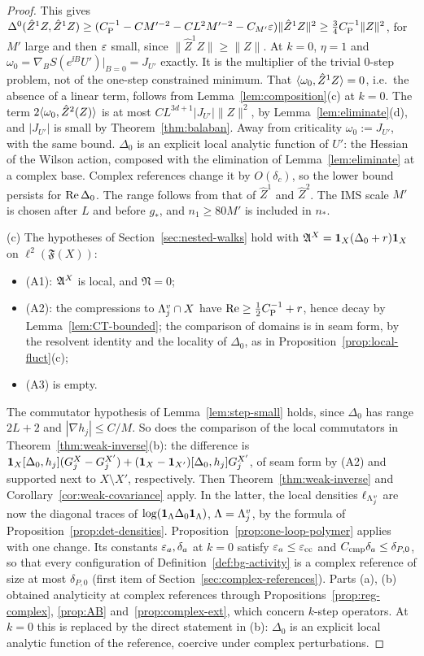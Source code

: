 \begin{proof}
This gives $\Delta^0(\hat Z^1Z,\hat Z^1Z)\ge(C_{\rm P}^{-1}-CM'^{-2}-CL^2M'^{-2}-C_{M'}\varepsilon)\|\hat Z^1Z\|^2\ge\frac34C_{\rm P}^{-1}\|Z\|^2$, for $M'$ large and then $\varepsilon$ small, since $\|\hat Z^1Z\|\ge\|Z\|$. At $k=0$, $\eta=1$ and $\omega_0=\nabla_BS(e^{\ii B}U')|_{B=0}=J_{U'}$ exactly. It is the multiplier of the trivial $0$-step problem, not of the one-step constrained minimum. That $\langle \omega_0,\hat Z^1Z\rangle=0$, i.e.\ the absence of a linear term, follows from Lemma~\ref{lem:composition}(c) at $k=0$. The term $2\langle \omega_0,\hat Z^2(Z)\rangle$ is at most $CL^{3d+1}|J_{U'}|\|Z\|^2$, by Lemma~\ref{lem:eliminate}(d), and $|J_{U'}|$ is small by Theorem~\ref{thm:balaban}. Away from criticality $\omega_0:=J_{U'}$, with the same bound. $\Delta_0$ is an explicit local analytic function of $U'$: the Hessian of the Wilson action, composed with the elimination of Lemma~\ref{lem:eliminate} at a complex base. Complex references change it by $O(\delta_c)$, so the lower bound persists for $\operatorname{Re}\Delta_0$. The range follows from that of $\hat Z^1$ and $\hat Z^2$. The IMS scale $M'$ is chosen after $L$ and before $g_*$, and $n_1\ge80M'$ is included in $n_*$.

(c) The hypotheses of Section~\ref{sec:nested-walks} hold with $\mathfrak A^X=\mathbf 1_X(\Delta_0+r)\mathbf 1_X$ on $\ell^2(\mathfrak F(X))$:
\begin{itemize}
\item (A1): $\mathfrak A^X$ is local, and $\mathfrak N=0$;
\item (A2): the compressions to $\Lambda^v_j\cap X$ have $\operatorname{Re}\ge\frac12C_{\rm P}^{-1}+r$, hence decay by Lemma~\ref{lem:CT-bounded}; the comparison of domains is in seam form, by the resolvent identity and the locality of $\Delta_0$, as in Proposition~\ref{prop:local-fluct}(c);
\item (A3) is empty.
\end{itemize}
The commutator hypothesis of Lemma~\ref{lem:step-small} holds, since $\Delta_0$ has range $2L+2$ and $|\nabla h_j|\le C/M$. So does the comparison of the local commutators in Theorem~\ref{thm:weak-inverse}(b): the difference is $\mathbf 1_X[\Delta_0,h_j](G^X_j-G^{X'}_j)+(\mathbf 1_X-\mathbf 1_{X'})[\Delta_0,h_j]G^{X'}_j$, of seam form by (A2) and supported next to $X\setminus X'$, respectively. Then Theorem~\ref{thm:weak-inverse} and Corollary~\ref{cor:weak-covariance} apply. In the latter, the local densities $\ell_{\Lambda^v_j}$ are now the diagonal traces of $\log(\mathbf 1_\Lambda\Delta_0\mathbf 1_\Lambda)$, $\Lambda=\Lambda^v_j$, by the formula of Proposition~\ref{prop:det-densities}. Proposition~\ref{prop:one-loop-polymer} applies with one change. Its constants $\varepsilon_a,\delta_a$ at $k=0$ satisfy $\varepsilon_a\le\varepsilon_{\rm cc}$ and $C_{\rm cmp}\delta_a\le\delta_{P,0}$, so that every configuration of Definition~\ref{def:bg-activity} is a complex reference of size at most $\delta_{P,0}$ (first item of Section~\ref{sec:complex-references}). Parts (a), (b) obtained analyticity at complex references through Propositions~\ref{prop:reg-complex}, \ref{prop:AB} and~\ref{prop:complex-ext}, which concern $k$-step operators. At $k=0$ this is replaced by the direct statement in (b): $\Delta_0$ is an explicit local analytic function of the reference, coercive under complex perturbations.


\end{proof}
